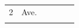 {{\begin{center}
\begin{xtabular}[t]{|l|l|l|l|l|l|}
    
        2 &
    
    
        Ave.%
     \tabularnewline{}
    
    
         &
    
    
         &
    
    
         &
    
    
         &
    
    
         &
    
    
     \tabularnewline{}
    

\end{xtabular}
\end{center}}}
